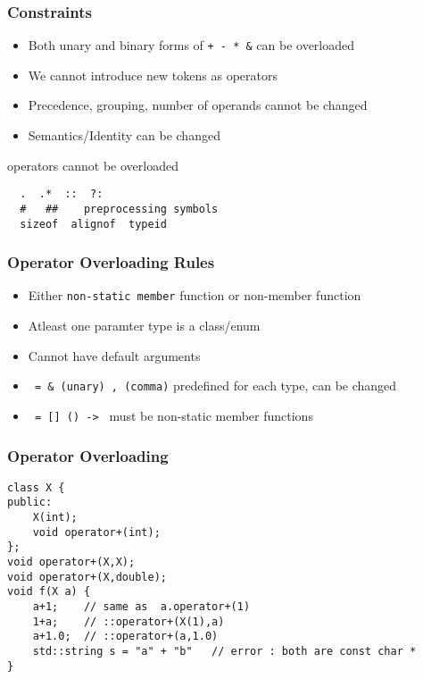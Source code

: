 \documentclass{beamer}
\begin{document}
\begin{frame}[fragile]
\frametitle{Constraints}

\begin{itemize}
\item Both unary and binary forms of \texttt{+  -  *  \&} can be overloaded
\item We cannot introduce new tokens as operators
\item Precedence, grouping, number of operands cannot be changed
\item Semantics/Identity can be changed
\end{itemize}
\begin{block}{operators cannot be overloaded}
\begin{lstlisting}
  .  .*  ::  ?:  
  #   ##    preprocessing symbols
  sizeof  alignof  typeid
\end{lstlisting}
\end{block}
\end{frame}


\begin{frame}[fragile]
\frametitle{Operator Overloading Rules}
\begin{itemize}
\item Either \texttt{non-static member} function or non-member function
\item Atleast one paramter type is a class/enum
\item Cannot have default arguments
\item \texttt{ = \& (unary) , (comma)} predefined for each type, can be changed
\item \texttt{ = [] () -> } must be non-static member functions
\end{itemize}

\end{frame}


\begin{frame}[fragile]
\frametitle{Operator Overloading}

\begin{example}
\begin{lstlisting}
class X {
public:
    X(int);
    void operator+(int);
};
void operator+(X,X);
void operator+(X,double);
void f(X a) {
    a+1;    // same as  a.operator+(1)
    1+a;    // ::operator+(X(1),a)
    a+1.0;  // ::operator+(a,1.0)
    std::string s = "a" + "b"   // error : both are const char *
}
\end{lstlisting}
\end{example}

\end{frame}
\end{document}
